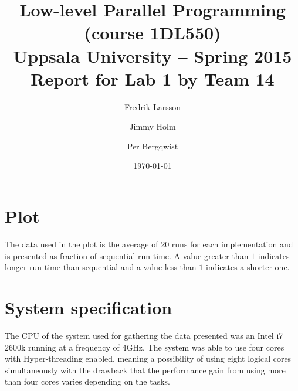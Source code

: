 \documentclass[a4paper,11pt]{article}
\title{\textbf{Low-level Parallel Programming (course 1DL550) \\
Uppsala University -- Spring 2015 \\
Report for Lab 1 by Team 14}}
\author{Fredrik Larsson \and Jimmy Holm \and Per Bergqwist}
\date{\today}
\begin{document}
\maketitle
\section{Plot}
\begin{center}
\end{center}
The data used in the plot is the average of 20 runs for each
implementation and is presented as fraction of sequential run-time. A value greater than $1$ indicates
longer run-time than sequential and a value less than $1$ indicates a shorter one.
\section{System specification}
The CPU of the system used for gathering the data presented was an Intel i7 2600k
running at a frequency of 4GHz. The system was able to use four cores
with Hyper-threading enabled, meaning a possibility of using eight logical
cores simultaneously with the drawback that the performance gain from
using more than four cores varies depending on the tasks.
\end{document}
